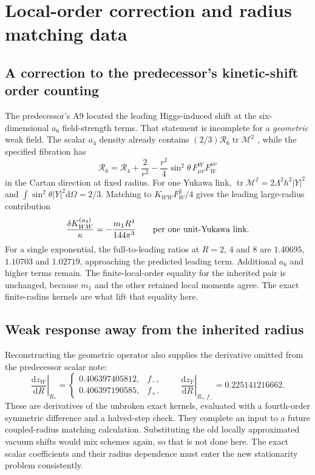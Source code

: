 \documentclass[11pt,letterpaper]{article}
\DeclareMathOperator{\tr}{tr}\DeclareMathOperator{\spec}{spec}
\newcommand{\dd}{\mathrm d}\newcommand{\Lam}{\Lambda}
\newcommand{\M}{\mathcal M}\newcommand{\B}{\mathcal B}
\begin{document}
\section{Local-order correction and radius matching data}

\subsection{A correction to the predecessor's kinetic-shift order counting}

The predecessor's A9 located the leading Higgs-induced shift at the six-dimensional $a_6$ field-strength terms. That statement is incomplete for a \emph{geometric} weak field. The scalar $a_4$ density already contains $(2/3)\mathcal R_6\tr\M^2$ \cite{Vass,scalar}, while the specified fibration has
\begin{equation}
 \mathcal R_6=\mathcal R_4+\frac2{r^2}
       -\frac{r^2}{4}\sin^2\theta\,F^W_{\mu\nu}F_W^{\mu\nu}
\end{equation}
in the Cartan direction at fixed radius. For one Yukawa link, $\tr\M^2=2\Lam^2h^2|Y|^2$ and $\int\sin^2\theta|Y|^2\dd\Omega=2/3$. Matching to $K_{WW}F_W^2/4$ gives the leading large-radius contribution
\begin{equation}
 [h^2]\frac{\delta K_{WW}^{(a_4)}}\kappa
 =-\frac{m_1R^4}{144\pi^3}\qquad\hbox{per one unit-Yukawa link}.
 \label{eq:a4correction}
\end{equation}
For a single exponential, the full-to-leading ratios at $R=2$, $4$ and $8$ are $1.40695$, $1.10703$ and $1.02719$, approaching the predicted leading term. Additional $a_6$ and higher terms remain. The finite-local-order equality for the inherited pair is unchanged, because $m_1$ and the other retained local moments agree. The exact finite-radius kernels are what lift that equality here.

\subsection{Weak response away from the inherited radius}

Reconstructing the geometric operator also supplies the derivative omitted from the predecessor scalar note:
\begin{equation}
 \left.\frac{\dd z_W}{\dd R}\right|_{R_*}
 =\begin{cases}0.406397405812,&f_-,\\0.406397190585,&f_+.
 \end{cases}
 \qquad
 \left.\frac{\dd z_Y}{\dd R}\right|_{R_*,f_-}=0.225141216662.
\end{equation}
These are derivatives of the unbroken exact kernels, evaluated with a fourth-order symmetric difference and a halved-step check. They complete an input to a future coupled-radius matching calculation. Substituting the old locally approximated vacuum shifts would mix schemes again, so that is not done here. The exact scalar coefficients and their radius dependence must enter the new stationarity problem consistently.
\end{document}
